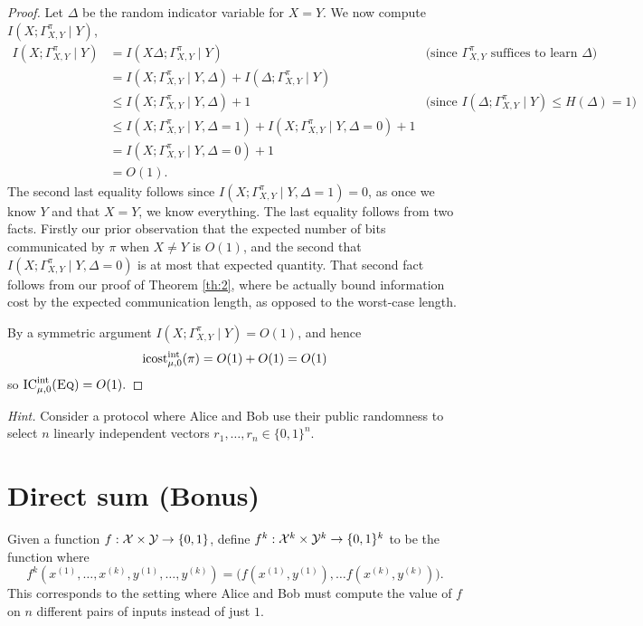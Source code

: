 \begin{proof}
Let $\Delta$ be the random indicator variable for $X=Y$. We now compute $I(X;\Gamma^\pi_{X,Y}\mid Y)$,
\begin{align*}
I(X;\Gamma^\pi_{X,Y} \mid Y) &= I(X\Delta;\Gamma^\pi_{X,Y}\mid Y) &\text{(since $\Gamma^\pi_{X,Y}$ suffices to learn $\Delta$)} \\
	&= I(X;\Gamma^\pi_{X,Y}\mid Y, \Delta) + I(\Delta;\Gamma^\pi_{X,Y}\mid Y) \\
	&\leq  I(X;\Gamma^\pi_{X,Y}\mid Y, \Delta) + 1  &\text{(since $I(\Delta;\Gamma^\pi_{X,Y}\mid Y) \leq H(\Delta) = 1$)}\\
	&\leq  I(X;\Gamma^\pi_{X,Y}\mid Y, \Delta=1) +  I(X;\Gamma^\pi_{X,Y}\mid Y, \Delta=0) + 1 \\
	&=  I(X;\Gamma^\pi_{X,Y}\mid Y, \Delta=0) + 1 \\
	&= O(1).
\end{align*}
The second last equality follows since $I(X;\Gamma^\pi_{X,Y}\mid Y, \Delta=1)=0$, as once we know $Y$ and that $X=Y$, we know everything. The last equality follows from two facts. Firstly our prior observation that the expected number of bits communicated by $\pi$ when $X\neq Y$ is $O(1)$, and the second that $ I(X;\Gamma^\pi_{X,Y}\mid Y, \Delta=0) $ is at most that expected quantity. That second fact follows from our proof of Theorem \ref{th:2}, where be actually bound information cost by the expected communication length, as opposed to the worst-case length.

By a symmetric argument $I(X;\Gamma^\pi_{X,Y} \mid Y) = O(1)$, and hence
$$\mathrm{icost}^{\mathrm{int}}_{\mu,0}(\pi) = O(1) + O(1) = O(1)$$
so $\mathrm{IC}^{\mathrm{int}}_{\mu,0}(\textsc{Eq}) = O(1).$
\end{proof}

\bigskip
\noindent \emph{Hint.} Consider a protocol where Alice and Bob use their public randomness to select $n$ linearly independent vectors $r_1,\ldots,r_n \in \{0,1\}^n$.


\newpage 
\section{Direct sum (Bonus)}

Given a function $f : \mathcal{X} \times \mathcal{Y} \to \{0,1\}$, define $f^k : \mathcal{X}^k \times \mathcal{Y}^k \to \{0,1\}^k$ to be the function where
\[
f^k(x^{(1)},\ldots,x^{(k)},y^{(1)},\ldots,y^{(k)}) = \big( f(x^{(1)},y^{(1)}), \ldots f(x^{(k)}, y^{(k)})\big).
\]
This corresponds to the setting where Alice and Bob must compute the value of $f$ on $n$ different pairs of inputs instead of just $1$.

